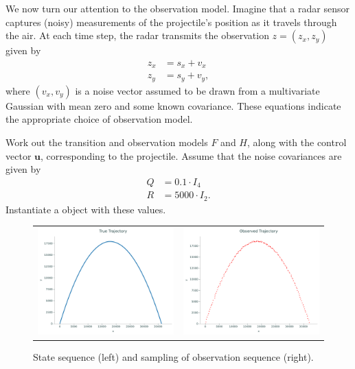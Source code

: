 We now turn our attention to the observation model.
Imagine that a radar sensor captures (noisy) measurements of the projectile's position as it travels through the air.
At each time step, the radar transmits the observation $z = (z_x, z_y)$ given by
\begin{align*}
z_x &= s_x + v_x\\
z_y &= s_y + v_y,
\end{align*}
where $(v_x, v_y)$ is a noise vector assumed to be drawn from a multivariate Gaussian with mean zero and some known covariance.
These equations indicate the appropriate choice of observation model.

\begin{problem}
Work out the transition and observation models $F$ and $H$, along with the control vector $\mathbf{u}$, corresponding to the projectile.
Assume that the noise covariances are given by
\begin{align*}
Q &= 0.1 \cdot I_4\\
R &= 5000 \cdot I_2.
\end{align*}
Instantiate a  object with these values.
\end{problem}

\begin{figure}
    \centering
    \begin{tabular}{cc}
    \includegraphics[width=.45\textwidth]{figures/states_evolution} &
    \includegraphics[width=.45\textwidth]{figures/obs_evolution}
    \end{tabular}
    \caption{State sequence (left) and sampling of observation sequence (right).}
    \label{fig:evolution}
\end{figure}

